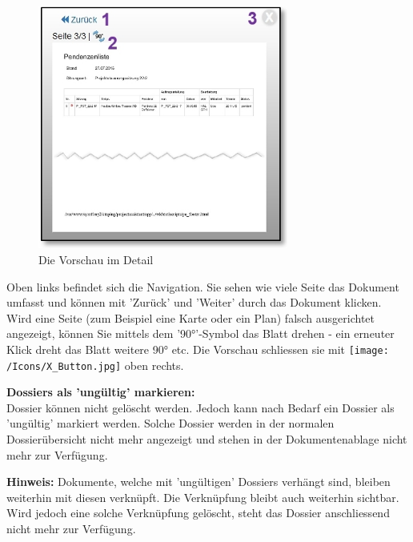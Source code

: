 \begin{figure}   %
  \vspace{-30pt}      %
  \begin{center}
    \includegraphics[height=80mm]{../chapters/11_Dokumentenablage/pictures/11-1-2_VorschauDetails.jpg}
  \end{center}
  \vspace{-20pt}
  \caption{Die Vorschau im Detail}
  \vspace{-10pt}
\end{figure}
Oben links befindet sich die Navigation. Sie sehen wie viele Seite das Dokument umfasst und können mit 'Zurück' und 'Weiter'  durch das Dokument klicken. Wird eine Seite (zum Beispiel eine Karte oder ein Plan) falsch ausgerichtet angezeigt, können Sie mittels dem '90°'-Symbol das Blatt drehen - ein erneuter Klick dreht das Blatt weitere 90° etc. Die Vorschau schliessen sie mit \texttt{[image: /Icons/X\_Button.jpg]}  oben rechts.

\vspace{1.5cm}

\textbf{Dossiers als 'ungültig' markieren:}\\
Dossier können nicht gelöscht werden. Jedoch kann nach Bedarf ein Dossier als 'ungültig' markiert werden. Solche Dossier werden in der normalen Dossierübersicht nicht mehr angezeigt und stehen in der Dokumentenablage nicht mehr zur Verfügung.

\vspace{\baselineskip}

\textbf{Hinweis:} Dokumente, welche mit 'ungültigen' Dossiers verhängt sind, bleiben weiterhin mit diesen verknüpft. Die Verknüpfung bleibt auch weiterhin sichtbar. Wird jedoch eine solche Verknüpfung gelöscht, steht das Dossier anschliessend nicht mehr zur Verfügung.

